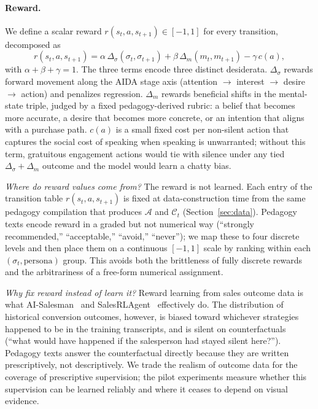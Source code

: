 \documentclass{article}
\begin{document}
\paragraph{Reward.}
We define a scalar reward $r(s_t, a, s_{t+1}) \in [-1, 1]$ for every transition, decomposed as
\[
r(s_t, a, s_{t+1}) = \alpha\, \Delta_\sigma(\sigma_t, \sigma_{t+1}) + \beta\, \Delta_m(m_t, m_{t+1}) - \gamma\, c(a),
\]
with $\alpha + \beta + \gamma = 1$. The three terms encode three distinct desiderata. $\Delta_\sigma$ rewards forward movement along the AIDA stage axis (attention $\to$ interest $\to$ desire $\to$ action) and penalizes regression. $\Delta_m$ rewards beneficial shifts in the mental-state triple, judged by a fixed pedagogy-derived rubric: a belief that becomes more accurate, a desire that becomes more concrete, or an intention that aligns with a purchase path. $c(a)$ is a small fixed cost per non-silent action that captures the social cost of speaking when speaking is unwarranted; without this term, gratuitous engagement actions would tie with silence under any tied $\Delta_\sigma + \Delta_m$ outcome and the model would learn a chatty bias.

\textit{Where do reward values come from?} The reward is not learned. Each entry of the transition table $r(s_t, a, s_{t+1})$ is fixed at data-construction time from the same pedagogy compilation that produces $\mathcal{A}$ and $\mathcal{C}_t$ (Section~\ref{sec:data}). Pedagogy texts encode reward in a graded but not numerical way (``strongly recommended,'' ``acceptable,'' ``avoid,'' ``never''); we map these to four discrete levels and then place them on a continuous $[-1, 1]$ scale by ranking within each $(\sigma_t, \text{persona})$ group. This avoids both the brittleness of fully discrete rewards and the arbitrariness of a free-form numerical assignment.

\textit{Why fix reward instead of learn it?} Reward learning from sales outcome data is what AI-Salesman~\cite{AISalesman} and SalesRLAgent~\cite{SalesRLAgent} effectively do. The distribution of historical conversion outcomes, however, is biased toward whichever strategies happened to be in the training transcripts, and is silent on counterfactuals (``what would have happened if the salesperson had stayed silent here?''). Pedagogy texts answer the counterfactual directly because they are written prescriptively, not descriptively. We trade the realism of outcome data for the coverage of prescriptive supervision; the pilot experiments measure whether this supervision can be learned reliably and where it ceases to depend on visual evidence.
\end{document}
